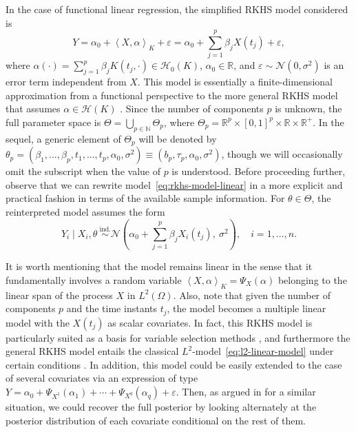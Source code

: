 \documentclass{article}
\numberwithin{equation}{section}
\theoremstyle{plain}
\theoremstyle{definition}
\renewcommand{\epsilon}{\varepsilon}
\newcommand{\N}{\mathbb{N}}
\newcommand{\R}{\mathbb{R}}
\newcommand{\Hcal}{\mathcal{H}}
\newcommand\dotprod[2]{\left\langle#1,#2\right\rangle}
\begin{document}
In the case of functional linear regression, the simplified RKHS model considered is
\begin{equation}\label{eq:rkhs-model-linear}
  Y = \alpha_0 + \dotprod{X}{\alpha}_K + \epsilon = \alpha_0 + \sum_{j=1}^p \beta_j X(t_j) + \epsilon,
\end{equation}
where \(\alpha(\cdot)=\sum_{j=1}^p\beta_j K(t_j, \cdot) \in \Hcal_{0}(K)\), \(\alpha_0\in\R\), and \(\epsilon \sim \mathcal N(0,\sigma^2)\) is an error term independent from \(X\). This model is essentially a finite-dimensional approximation from a functional perspective to the more general RKHS model that assumes \(\alpha \in \Hcal(K)\) \citep[e.g.][]{berrendero2024functional}. Since the number of components \(p\) is unknown, the full parameter space is \(\Theta = \bigcup_{p\in\N}\Theta_p\), where \(\Theta_p = \R^p \times [0, 1]^p \times \R \times \R^+\). In the sequel, a generic element of \(\Theta_p\) will be denoted by \(\theta_p = (\beta_1,\dots, \beta_p, t_1,\dots, t_p, \alpha_0, \sigma^2) \equiv (b_p, \tau_p, \alpha_0, \sigma^2)\), though we will occasionally omit the subscript when the value of \(p\) is understood. Before proceeding further, observe that we can rewrite model~\eqref{eq:rkhs-model-linear} in a more explicit and practical fashion in terms of the available sample information. For \(\theta \in \Theta\), the reinterpreted model assumes the form
\begin{equation}\label{eq:rkhs-model-linear-2}
  Y_i \mid X_i, \theta \ \stackrel{\text{ind.}}{\sim} \mathcal N\left(\alpha_0 + \sum_{j=1}^p \beta_j X_i(t_j), \ \sigma^2\right), \quad i =1,\dots, n.
\end{equation}

It is worth mentioning that the model remains linear in the sense that it fundamentally involves a random variable \(\dotprod{X}{\alpha}_K = \Psi_X(\alpha)\) belonging to the linear span of the process \(X\) in \(L^2(\Omega)\). Also, note that given the number of components \(p\) and the time instants \(t_j\), the model becomes a multiple linear model with the \(X(t_j)\) as scalar covariates. In fact, this RKHS model is particularly suited as a basis for variable selection methods \citep{berrendero2019rkhs}, and furthermore the general RKHS model entails the classical \(L^2\)-model~\eqref{eq:l2-linear-model} under certain conditions \citep[see][]{berrendero2024functional}. In addition, this model could be easily extended to the case of several covariates via an expression of type \(Y=\alpha_0 + \Psi_{X^{1}}(\alpha_1) + \cdots + \Psi_{X^{q}}(\alpha_q) + \epsilon\). Then, as argued in \citet{grollemund2019bayesian} for a similar situation, we could recover the full posterior by looking alternately at the posterior distribution of each covariate conditional on the rest of them.
\end{document}
